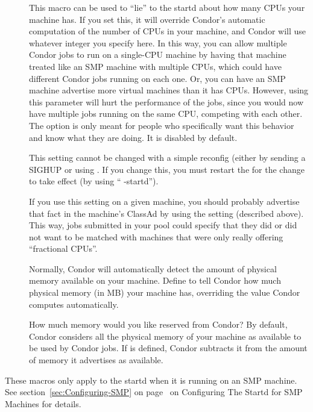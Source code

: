 \begin{description}
\item[] \label{param:NumCpus}
  This macro can be used to ``lie'' to the startd about how many CPUs
  your machine has.
  If you set this, it will override Condor's automatic computation of
  the number of CPUs in your machine, and Condor will use whatever
  integer you specify here. 
  In this way, you can allow multiple Condor jobs to run on a
  single-CPU machine by having that machine treated like an SMP
  machine with multiple CPUs, which could have different Condor jobs
  running on each one.
  Or, you can have an SMP machine advertise more virtual machines than
  it has CPUs.
  However, using this parameter will hurt the performance of the jobs,
  since you would now have multiple jobs running on the same CPU,
  competing with each other.
  The option is only meant for people who specifically want this
  behavior and know what they are doing.  
  It is disabled by default.

  \Note This setting cannot be changed with a simple reconfig (either
  by sending a SIGHUP or using .
  If you change this, you must restart the  for the
  change to take effect (by using `` -startd'').

  \Note If you use this setting on a given machine, you should
  probably advertise that fact in the machine's ClassAd by using the
   setting (described above).
  This way, jobs submitted in your pool could specify that they did or
  did not want to be matched with machines that were only really
  offering ``fractional CPUs''.

\item[] \label{param:Memory}
  Normally, Condor will automatically detect the amount of physical
  memory available on your machine.  Define  to tell
  Condor how much physical memory (in MB) your machine has, overriding
  the value Condor computes automatically.

\item[] \label{param:ReservedMemory}
  How much memory would you like reserved from Condor?  By default,
  Condor considers all the physical memory of your machine as
  available to be used by Condor jobs.  If  is
  defined, Condor subtracts it from the amount of memory it advertises
  as available.

\end{description}

These macros only apply to the startd when it is running on an
SMP machine. 
See section~\ref{sec:Configuring-SMP} on
page~\pageref{sec:Configuring-SMP} on Configuring The Startd for 
SMP Machines for details.

